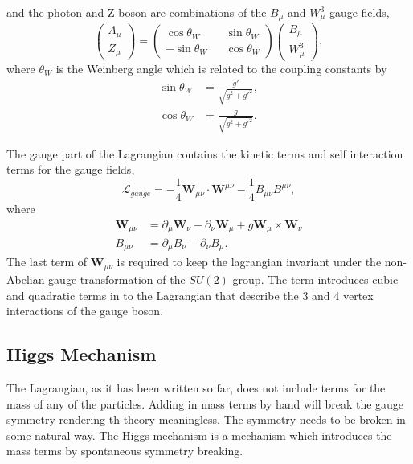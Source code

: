 and the photon and Z boson are combinations of the $B_{\mu}$ and $W^{3}_{\mu}$
gauge fields,
\begin{equation}
\left( \begin{matrix} A_{\mu}\\ Z_{\mu}\end{matrix}\right) =
\left( \begin{matrix} \cos\theta_{W} && \sin\theta_{W} \\  
                      -\sin\theta_{W} && \cos\theta_{W} \end{matrix}\right) 
\left( \begin{matrix} B_{\mu}\\ W^{3}_{\mu}\end{matrix}\right) ,
\label{eq:bgauge}
\end{equation}
where $\theta_{W}$ is the Weinberg angle which is related to the coupling
constants by
\begin{align*}
\sin\theta_{W} &= \frac{g\prime}{\sqrt{g^{2}+g\prime^{2}}},\\
\cos\theta_{W} &= \frac{g}{\sqrt{g^{2}+g\prime^{2}}}.
\end{align*}

The gauge part of the Lagrangian contains the kinetic terms and self interaction
terms for the gauge fields,
\begin{equation}
\mathcal{L}_{gauge} = 
- \frac{1}{4} \mathbf{W}_{\mu\nu} \cdot \mathbf{W}^{\mu\nu}
- \frac{1}{4} B_{\mu\nu} B^{\mu\nu},
\end{equation}
where
\begin{align*}
\mathbf{W}_{\mu\nu} &=
\partial_{\mu} \mathbf{W}_{\nu} -
\partial_{\nu} \mathbf{W}_{\mu} +
g \mathbf{W}_{\mu} \times \mathbf{W}_{\nu}\\
B_{\mu\nu} &= 
\partial_{\mu} B_{\nu}-
\partial_{\nu} B_{\mu}.
\end{align*}
The last term of $\mathbf{W}_{\mu\nu}$ is required to keep the lagrangian invariant
under the non-Abelian gauge transformation of the $SU(2)$ group. The term
introduces cubic and quadratic terms in to the Lagrangian that describe the 3 and 4
vertex interactions of the gauge boson.

\subsection{Higgs Mechanism}
The Lagrangian, as it has been written so far, does not include terms for the
mass of any of the particles. 
Adding in mass terms by hand will break the
gauge symmetry rendering th theory meaningless. The symmetry needs to be broken
in some natural way.
The Higgs mechanism is a mechanism which introduces the mass terms by
spontaneous symmetry breaking.

